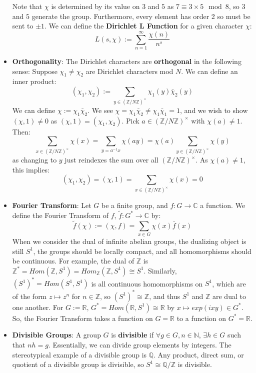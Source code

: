 \documentclass[11pt, oneside]{amsart}   	%
\theoremstyle{definition}
\begin{document}
\begin{itemize}
	Note that $\chi$ is determined by its value on $3$ and $5$ as $7 \equiv 3\times 5\mod 8$, so $3$ and $5$ generate the group. Furthermore, every 
	element has order 2 so must be sent to $\pm 1$. We can define the \textbf{Dirichlet L Function} for a given character $\chi$:
	$$
		L(s, \chi) := \sum_{n = 1}^\infty\frac{\chi(n)}{n^s}
	$$
	
	\item \textbf{Orthogonality}: The Dirichlet characters are \textbf{orthogonal} in the following sense: Suppose $\chi_1\neq\chi_2$ are Dirichlet 
	characters mod $N$. We can define an inner product:
	$$
		(\chi_1, \chi_2) := \sum_{y\in(\mathbb Z / N\mathbb Z)^\times}\chi_1(y)\bar\chi_2(y)
	$$
	We can define $\chi := \chi_1\bar\chi_2$. We see $\chi = \chi_1\bar\chi_2\neq\chi_1\bar\chi_1 = 1$, and we wish to show $(\chi, 1)\neq 0$ as $(\chi, 
	1) = (\chi_1, \chi_2)$. Pick $a\in(\mathbb Z / N\mathbb Z)^\times$ with $\chi(a)\neq 1$. Then:
	$$
		\sum_{x\in(\mathbb Z / N\mathbb Z)^\times}\chi(x) = \sum_{y = a^{-1}x}\chi(ay) = \chi(a)\sum_{y\in(\mathbb Z / N\mathbb Z)^\times}\chi(y)
	$$
	as changing to $y$ just reindexes the sum over all $(\mathbb Z / N\mathbb Z)^\times$. As $\chi(a)\neq 1$, this implies:
	$$
		(\chi_1, \chi_2) = (\chi, 1) = \sum_{x\in(\mathbb Z / N\mathbb Z)^\times}\chi(x) = 0
	$$
	
	\item \textbf{Fourier Transform}: Let $G$ be a finite group, and $f : G\rightarrow \mathbb C$ a function. We define the Fourier Transform of $f$, 
	$\tilde f : G^*\rightarrow\mathbb C$ by:
	$$
		\tilde f(\chi) := (\chi, f) = \sum_{x\in G}\chi(x)\bar f(x)
	$$
	When we consider the dual of infinite abelian groups, the dualizing object is still $S^1$, the groups should be locally compact, and all 
	homomorphisms should be continuous. For example, the dual of $\mathbb Z$ is $\mathbb Z^* = Hom(\mathbb Z, S^1) = Hom_\mathbb Z(\mathbb Z, 
	S^1)\cong S^1$. Similarly, $(S^1)^* = Hom(S^1, S^1)$ is all continuous homomorphisms on $S^1$, which are of the form $z\mapsto z^n$ for $n\in 
	\mathbb Z$, so $(S^1)^*\cong\mathbb Z$, and thus $S^1$ and $\mathbb Z$ are dual to one another. For $G := \mathbb R$, $G^* = Hom(\mathbb R, 
	S^1)\cong\mathbb R$ by $x\mapsto exp(ixy) \in G^*$. So, the Fourier Transform takes a function on $G = \mathbb R$ to a function on $G^* = 
	\mathbb R$. 
	
	\item \textbf{Divisible Groups}: A group $G$ is \textbf{divisible} if $\forall g\in G, n\in\mathbb N$, $\exists h\in G$ such that $nh = g$. Essentially, we 
	can divide group elements by integers. The stereotypical example of a divisible group is $\mathbb Q$. Any product, direct sum, or quotient of a 
	divisible group is divisible, so $S^1\cong \mathbb Q / \mathbb Z$ is divisible. 
	

\end{itemize}
\end{document}
